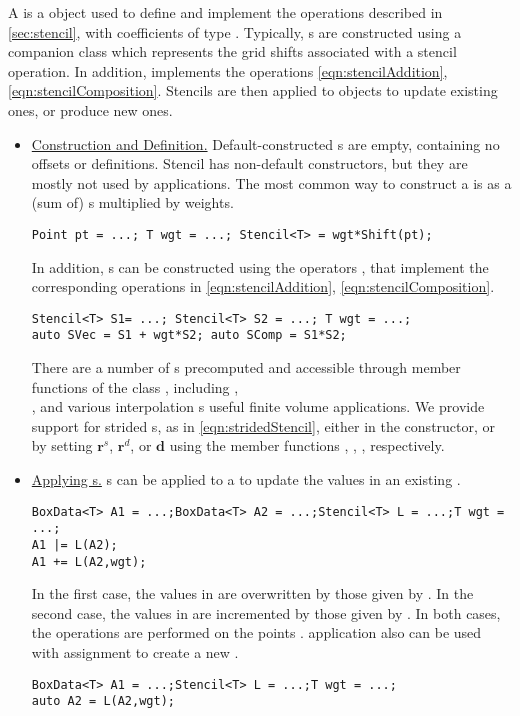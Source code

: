 \documentclass[12pt]{article}
\newcommand{\Stencil}{\code{Stencil}}
\newcommand{\BoxData}{\code{BoxData} }
\begin{document}
A  is a object used to define and implement the operations described in \ref{sec:stencil}, with coefficients of type . Typically, s are constructed using a companion class  which represents the grid shifts associated with a stencil operation. In addition,  implements the operations \eqref{eqn:stencilAddition}, \eqref{eqn:stencilComposition}. Stencils are then applied to  objects to update existing ones, or produce new ones.

\begin{itemize}
\item
\underline{Construction and Definition.}
Default-constructed s are empty, containing no offsets or definitions. 
Stencil has non-default constructors, but they are mostly not used by applications. The most common way to construct a  is as a (sum of) s multiplied by weights.
\begin{verbatim}
Point pt = ...; T wgt = ...; Stencil<T> = wgt*Shift(pt);
\end{verbatim}
In addition, \Stencil s can be constructed using the operators \code{+}, \code{*} that implement the corresponding operations in \eqref{eqn:stencilAddition}, \eqref{eqn:stencilComposition}.
\begin{verbatim}
Stencil<T> S1= ...; Stencil<T> S2 = ...; T wgt = ...;
auto SVec = S1 + wgt*S2; auto SComp = S1*S2;
\end{verbatim}
There are a number of s precomputed and accessible through member functions of the class , including , \\ , and various interpolation s useful finite volume applications. 
We provide support for strided s, as in \eqref{eqn:stridedStencil}, either in the constructor, or by setting $\boldsymbol{r}^s$, $\boldsymbol{r}^d$, or $\boldsymbol{d}$ using the member functions , , , respectively.
\item
\underline{Applying \Stencil s.}
\Stencil s can be applied to a \BoxData  to update the values in an existing \BoxData .
\begin{verbatim}
BoxData<T> A1 = ...;BoxData<T> A2 = ...;Stencil<T> L = ...;T wgt = ...;
A1 |= L(A2);
A1 += L(A2,wgt);
\end{verbatim}
In the first case, the values in  are overwritten by those given by .  In the second case, the values in  are incremented by those given by . In both cases, the operations are performed on the points . 
 application also can be used with assignment to create a new \BoxData.
\begin{verbatim}
BoxData<T> A1 = ...;Stencil<T> L = ...;T wgt = ...;
auto A2 = L(A2,wgt);
\end{verbatim}
\end{itemize} 
\end{document}
